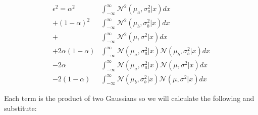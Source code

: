 \documentclass{article}
\begin{document}
\begin{equation}
\begin{aligned}
\label{eqn:normalproduct}
    \epsilon^2 =
        \alpha^2 & \int_{-\infty}^{\infty} \mathcal{N}^2(\mu_a, \sigma_a^2|x) dx \\
        + (1-\alpha)^2 & \int_{-\infty}^{\infty} \mathcal{N}^2(\mu_b, \sigma_b^2|x) dx \\
        + & \int_{-\infty}^{\infty} \mathcal{N}^2(\mu, \sigma^2|x) dx \\
        + 2 \alpha (1-\alpha) & \int_{-\infty}^{\infty} \mathcal{N}(\mu_a, \sigma_a^2|x) \mathcal{N}(\mu_b, \sigma_b^2|x) dx \\
        - 2 \alpha & \int_{-\infty}^{\infty} \mathcal{N}(\mu_a, \sigma_a^2|x) \mathcal{N}(\mu, \sigma^2|x) dx \\
        - 2 (1-\alpha) & \int_{-\infty}^{\infty} \mathcal{N}(\mu_b, \sigma_b^2|x)\mathcal{N}(\mu, \sigma^2|x)dx 
\end{aligned}
\end{equation}

Each term is the product of two Gaussians so we will calculate the following and substitute:
\end{document}
